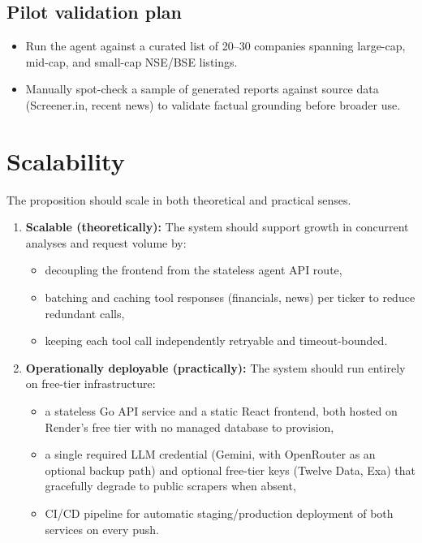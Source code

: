 \documentclass[11pt,a4paper]{article}
\begin{document}
\subsection{Pilot validation plan}
\begin{itemize}[leftmargin=0.7cm]
    \item Run the agent against a curated list of 20--30 companies spanning large-cap, mid-cap, and small-cap NSE/BSE listings.
    \item Manually spot-check a sample of generated reports against source data (Screener.in, recent news) to validate factual grounding before broader use.
\end{itemize}

\section{Scalability}
The proposition should scale in both theoretical and practical senses.

\begin{enumerate}[leftmargin=0.7cm]
    \item \textbf{Scalable (theoretically):} The system should support growth in concurrent analyses and request volume by:
    \begin{itemize}[leftmargin=0.7cm]
        \item decoupling the frontend from the stateless agent API route,
        \item batching and caching tool responses (financials, news) per ticker to reduce redundant calls,
        \item keeping each tool call independently retryable and timeout-bounded.
    \end{itemize}
    
    \item \textbf{Operationally deployable (practically):} The system should run entirely on free-tier infrastructure:
    \begin{itemize}[leftmargin=0.7cm]
        \item a stateless Go API service and a static React frontend, both hosted on Render's free tier with no managed database to provision,
        \item a single required LLM credential (Gemini, with OpenRouter as an optional backup path) and optional free-tier keys (Twelve Data, Exa) that gracefully degrade to public scrapers when absent,
        \item CI/CD pipeline for automatic staging/production deployment of both services on every push.
    \end{itemize}
\end{enumerate}
\end{document}

